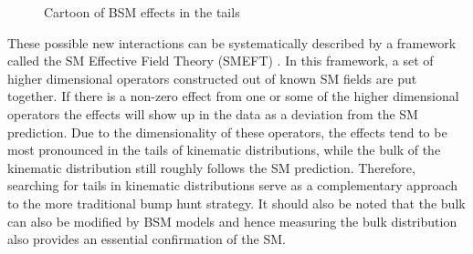 \begin{figure}[htb]
\centering
    \quad\quad
\caption{Cartoon of BSM effects in the tails}
\label{fig:BSMTails}
\end{figure}

These possible new interactions can be systematically described by a framework called the SM Effective Field Theory (SMEFT) \cite{deBlas:2017xtg}.
In this framework, a set of higher dimensional operators constructed out of known SM fields are put together.
If there is a non-zero effect from one or some of the higher dimensional operators the effects will show up in the data as a deviation from the SM prediction.
Due to the dimensionality of these operators, the effects tend to be most pronounced in the tails of kinematic distributions, while the bulk of the kinematic distribution still roughly follows the SM prediction.
Therefore, searching for tails in kinematic distributions serve as a complementary approach to the more traditional bump hunt strategy.
It should also be noted that the bulk can also be modified by BSM models and hence measuring the bulk distribution also provides an essential confirmation of the SM.

